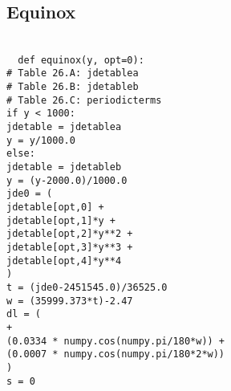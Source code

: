 \subsection{Equinox}
\label{app:equinox}
\texttt{ \\
~~def equinox(y, opt=0):\\
 \indent \# Table 26.A: jde\textunderscore table\textunderscore a \\
 \indent \# Table 26.B: jde\textunderscore table\textunderscore b \\
 \indent \# Table 26.C: periodic\textunderscore terms \\
 \indent if y < 1000:\\
 \indent \indent jde\textunderscore table = jde\textunderscore table\textunderscore a \\
 \indent \indent y = y/1000.0 \\
 \indent else: \\
 \indent \indent jde\textunderscore table = jde\textunderscore table\textunderscore b \\
 \indent \indent y = (y-2000.0)/1000.0 \\
 \indent jde0 = ( \\
 \indent \indent jde\textunderscore table[opt,0] + \\
 \indent \indent jde\textunderscore table[opt,1]*y + \\
 \indent \indent jde\textunderscore table[opt,2]*y**2 + \\
 \indent \indent jde\textunderscore table[opt,3]*y**3 + \\
 \indent \indent jde\textunderscore table[opt,4]*y**4 \\
 \indent ) \\
 \indent t = (jde0-2451545.0)/36525.0 \\
 \indent w = (35999.373*t)-2.47 \\
 \indent dl = ( \\
 \indent {} + \\
 \indent \indent (0.0334 * numpy.cos(numpy.pi/180*w)) + \\
 \indent \indent (0.0007 * numpy.cos(numpy.pi/180*2*w)) \\
 \indent ) \\
 \indent s = 0 \\
}
